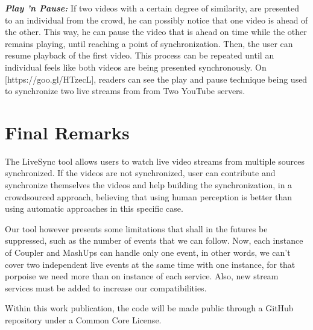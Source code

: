 \documentclass{sig-alternate-05-2015}
\begin{document}
\textbf{\textit{Play 'n Pause:}} If two videos with a certain degree of similarity, are presented to an individual from the crowd, he can possibly notice that one video is ahead of the other. This way, he can pause the video that is ahead on time while the other remains playing, until reaching a point of synchronization. Then, the user can resume playback of the first video. This process can be repeated until an individual feels like both videos are being presented synchronously. On [https://goo.gl/HTzecL], readers can see the play and pause technique being used to synchronize two live streams from from Two YouTube servers.

\section{Final Remarks}
The LiveSync tool allows users to watch live video streams from multiple sources synchronized. If the videos are not synchronized, user can contribute and synchronize themselves the videos and help building the synchronization, in a crowdsourced approach, believing that using human perception is better than using automatic approaches in this specific case.

Our tool however presents some limitations that shall in the futures be suppressed, such as the number of events that we can follow. Now, each instance of Coupler and MashUps can handle only one event, in other words, we can't cover two independent live events at the same time with one instance, for that porpoise we need more than on instance of each service. Also, new stream services must be added to increase our compatibilities.

Within this work publication, the code will be made public through a GitHub repository under a Common Core License.



  
\end{document}
